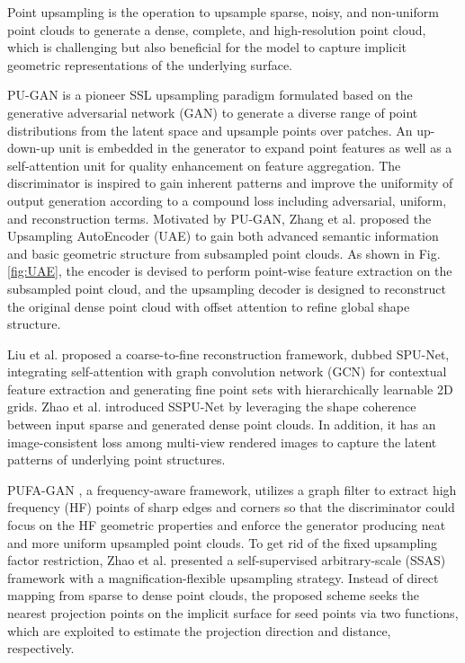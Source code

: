 \documentclass[a4paper,fleqn]{cas-dc}
\begin{document}
Point upsampling is the operation to upsample sparse, noisy, and non-uniform point clouds to generate a dense, complete, and high-resolution point cloud, which is challenging but also beneficial for the model to capture implicit geometric representations of the underlying surface.

PU-GAN \citep{li2019pu} is a pioneer SSL upsampling paradigm formulated based on the generative adversarial network (GAN) \citep{goodfellow2014generative} to generate a diverse range of point distributions from the latent space and upsample points over patches. An up-down-up unit is embedded in the generator to expand point features as well as a self-attention unit for quality enhancement on feature aggregation. The discriminator is inspired to gain inherent patterns and improve the uniformity of output generation according to a compound loss including adversarial, uniform, and reconstruction terms. Motivated by PU-GAN, Zhang et al. proposed the Upsampling AutoEncoder (UAE) \citep{zhang2022upsampling} to gain both advanced semantic information and basic geometric structure from subsampled point clouds. As shown in Fig. \ref{fig:UAE}, the encoder is devised to perform point-wise feature extraction on the subsampled point cloud, and the upsampling decoder is designed to reconstruct the original dense point cloud with offset attention \citep{guo2021pct} to refine global shape structure. 

Liu et al. \citep{liu2022spu} proposed a coarse-to-fine reconstruction framework, dubbed SPU-Net, integrating self-attention with graph convolution network (GCN) for contextual feature extraction and generating fine point sets with hierarchically learnable 2D grids. Zhao et al. \citep{zhao2021sspu} introduced SSPU-Net by leveraging the shape coherence between input sparse and generated dense point clouds. In addition, it has an image-consistent loss among multi-view rendered images to capture the latent patterns of underlying point structures. 

PUFA-GAN \citep{liu2022pufa}, a frequency-aware framework, utilizes a graph filter to extract high frequency (HF) points of sharp edges and corners so that the discriminator could focus on the HF geometric properties and enforce the generator producing neat and more uniform upsampled point clouds. To get rid of the fixed upsampling factor restriction, Zhao et al. \citep{zhao2022self} presented a self-supervised arbitrary-scale (SSAS) framework with a magnification-flexible upsampling strategy. Instead of direct mapping from sparse to dense point clouds, the proposed scheme seeks the nearest projection points on the implicit surface for seed points via two functions, which are exploited to estimate the projection direction and distance, respectively.
\end{document}
